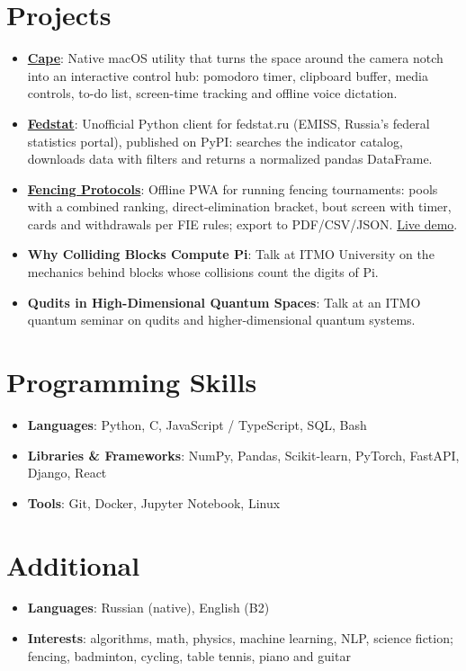 \documentclass[letterpaper,11pt]{article}
\newcommand{\resumeItem}[2]{
  \item\small{
    \textbf{#1}{: #2 \vspace{-2pt}}
  }
}
\newcommand{\resumeSubItem}[2]{\resumeItem{#1}{#2}\vspace{-4pt}}
\newcommand{\resumeSubHeadingListStart}{\begin{itemize}[leftmargin=*]}
\newcommand{\resumeSubHeadingListEnd}{\end{itemize}}
\begin{document}
\section{Projects}
  \resumeSubHeadingListStart
    \resumeSubItem{\href{https://github.com/timryadovouu/cape}{Cape}}
      {Native macOS utility that turns the space around the camera notch into an interactive control hub: pomodoro timer, clipboard buffer, media controls, to-do list, screen-time tracking and offline voice dictation.}
    \resumeSubItem{\href{https://github.com/timryadovouu/fedstat}{Fedstat}}
      {Unofficial Python client for fedstat.ru (EMISS, Russia's federal statistics portal), published on PyPI: searches the indicator catalog, downloads data with filters and returns a normalized pandas DataFrame.}
    \resumeSubItem{\href{https://github.com/timryadovouu/fencing-app}{Fencing Protocols}}
      {Offline PWA for running fencing tournaments: pools with a combined ranking, direct-elimination bracket, bout screen with timer, cards and withdrawals per FIE rules; export to PDF/CSV/JSON. \href{https://fencing-app.timtrue18.workers.dev/}{Live demo}.}
    \resumeSubItem{Why Colliding Blocks Compute Pi}
      {Talk at ITMO University on the mechanics behind blocks whose collisions count the digits of Pi.}
    \resumeSubItem{Qudits in High-Dimensional Quantum Spaces}
      {Talk at an ITMO quantum seminar on qudits and higher-dimensional quantum systems.}
  \resumeSubHeadingListEnd


\section{Programming Skills}
 \resumeSubHeadingListStart
   \item{
     \textbf{Languages}{: Python, C, JavaScript / TypeScript, SQL, Bash}
   }
   \item{
     \textbf{Libraries \& Frameworks}{: NumPy, Pandas, Scikit-learn, PyTorch, FastAPI, Django, React}
   }
   \item{
     \textbf{Tools}{: Git, Docker, Jupyter Notebook, Linux}
   }
 \resumeSubHeadingListEnd


\section{Additional}
 \resumeSubHeadingListStart
   \item{
     \textbf{Languages}{: Russian (native), English (B2)}
   }
   \item{
     \textbf{Interests}{: algorithms, math, physics, machine learning, NLP, science fiction; fencing, badminton, cycling, table tennis, piano and guitar}
   }
 \resumeSubHeadingListEnd


\end{document}
